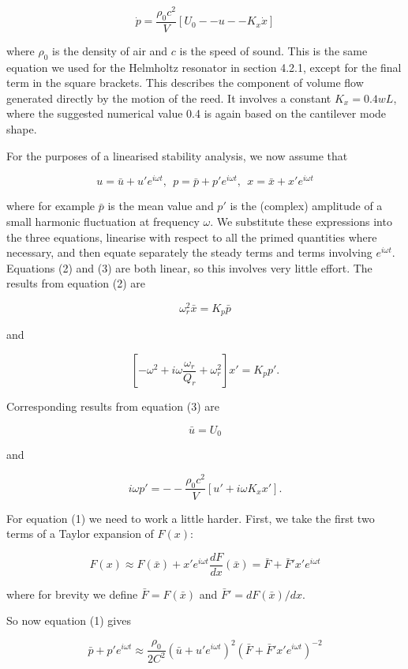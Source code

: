   $$\dot{p}=\dfrac{\rho_0 c^2}{V}[U_0 -- u -- K_x \dot{x}] \tag{3}$$ 

  where $\rho_0$ is the density of air and $c$ is the speed of sound. This is 
  the same equation we used for the Helmholtz resonator in section 4.2.1, 
  except for the final term in the square brackets. This describes the 
  component of volume flow generated directly by the motion of the reed. It 
  involves a constant $K_x=0.4wL$, where the suggested numerical value 0.4 is 
  again based on the cantilever mode shape. 

  For the purposes of a linearised stability analysis, we now assume that 

  $$u=\bar{u}+u' e^{i \omega t} \mathrm{,~~} p=\bar{p}+p' e^{i \omega t} 
  \mathrm{,~~} x=\bar{x}+x' e^{i \omega t} \tag{4}$$ 

  where for example $\bar{p}$ is the mean value and $p'$ is the (complex) 
  amplitude of a small harmonic fluctuation at frequency $\omega$. We 
  substitute these expressions into the three equations, linearise with respect 
  to all the primed quantities where necessary, and then equate separately the 
  steady terms and terms involving $e^{i \omega t}$. Equations (2) and (3) are 
  both linear, so this involves very little effort. The results from equation 
  (2) are 

  $$\omega_r^2 \bar{x}=K_p \bar{p} \tag{5}$$ 

  and 

  $$\left[ -\omega^2 + i \omega \dfrac{\omega_r}{Q_r} + \omega_r^2 \right]x' = 
  K_p p' . \tag{6}$$ 

  Corresponding results from equation (3) are 

  $$\bar{u}=U_0 \tag{7}$$ 

  and 

  $$i \omega p' = -- \dfrac{\rho_0 c^2}{V} [u'+i \omega K_x x'] . \tag{8}$$ 

  For equation (1) we need to work a little harder. First, we take the first 
  two terms of a Taylor expansion of $F(x)$: 

  $$F(x) \approx F(\bar{x}) + x' e^{i \omega t} 
  \dfrac{dF}{dx}(\bar{x})=\bar{F}+\bar{F}' x' e^{i \omega t}\tag{9}$$ 

  where for brevity we define $\bar{F}=F(\bar{x})$ and 
  $\bar{F}'=dF(\bar{x})/dx$. 

  So now equation (1) gives 

  $$\bar{p}+p'e^{i \omega t}\approx \dfrac{\rho_0}{2C^2}\left( \bar{u}+u'e^{i 
  \omega t} \right)^2\left(\bar{F}+\bar{F}' x' e^{i \omega t} \right)^{-2}$$ 

